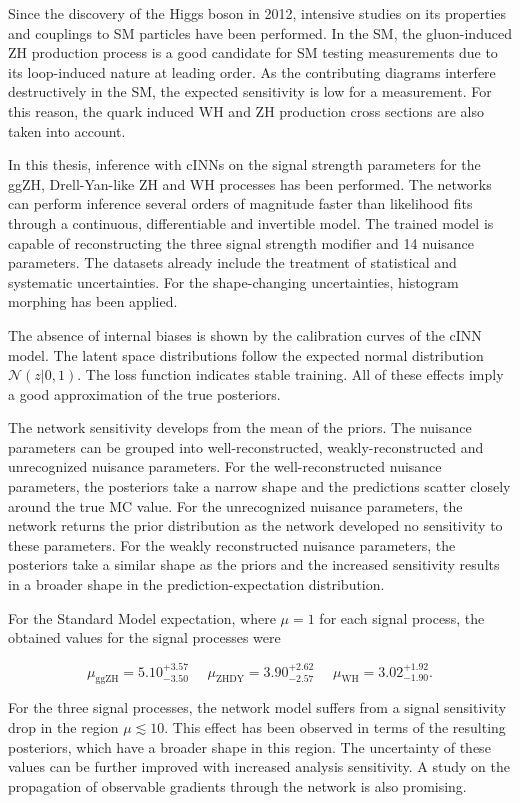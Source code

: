 \label{sec:conclusion}

Since the discovery of the Higgs boson in 2012, intensive studies on its properties and couplings to SM particles have been performed. In the SM, the gluon-induced ZH production process is a good candidate for SM testing measurements due to its loop-induced nature at leading order. As the contributing diagrams interfere destructively in the SM, the expected sensitivity is low for a measurement. For this reason, the quark induced WH and ZH production cross sections are also taken into account.

In this thesis, inference with cINNs on the signal strength parameters for the ggZH, Drell-Yan-like ZH and WH processes has been performed. The networks can perform inference several orders of magnitude faster than likelihood fits through a continuous, differentiable and invertible model. The trained model is capable of reconstructing the three signal strength modifier and 14 nuisance parameters. The datasets already include the treatment of statistical and systematic uncertainties. For the shape-changing uncertainties, histogram morphing has been applied.

The absence of internal biases is shown by the calibration curves of the cINN model. The latent space distributions follow the expected normal distribution $\mathcal{N}(z | 0,1)$. The loss function indicates stable training. All of these effects imply a good approximation of the true posteriors.

The network sensitivity develops from the mean of the priors. The nuisance parameters can be grouped into well-reconstructed, weakly-reconstructed and unrecognized nuisance parameters. For the well-reconstructed nuisance parameters, the posteriors take a narrow shape and the predictions scatter closely around the true MC value. For the unrecognized nuisance parameters, the network returns the prior distribution as the network developed no sensitivity to these parameters. For the weakly reconstructed nuisance parameters, the posteriors take a similar shape as the priors and the increased sensitivity results in a broader shape in the prediction-expectation distribution.

For the Standard Model expectation, where $\mu=1$ for each signal process, the obtained values for the signal processes were

\begin{equation*}
	\mu_\text{ggZH} = 5.10^{+3.57}_{-3.50} \, \, \quad \mu_\text{ZHDY} = 3.90^{+2.62}_{-2.57} \, \, \quad \mu_\text{WH} = 3.02^{+1.92}_{-1.90}.
\end{equation*}

For the three signal processes, the network model suffers from a signal sensitivity drop in the region $\mu\lesssim10$. This effect has been observed in terms of the resulting posteriors, which have a broader shape in this region. The uncertainty of these values can be further improved with increased analysis sensitivity. A study on the propagation of observable gradients through the network is also promising.